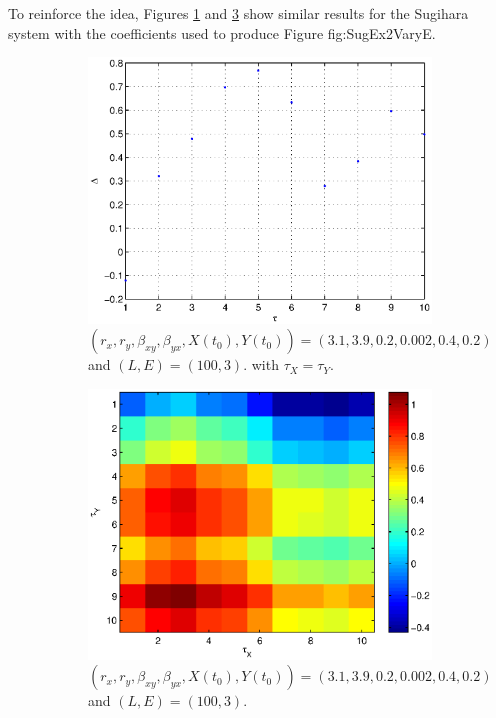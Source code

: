 \documentclass[a4paper,11pt]{article}
\begin{document}
To reinforce the idea, Figures \ref{fig:SugEx2vTauXY} and \ref{fig:SugEx2vTauXvTauY} show similar results for the Sugihara system with the coefficients used to produce Figure {fig:SugEx2VaryE}.
\begin{figure}[h!t]
\centering
\begin{subfigure}[b]{0.4\textwidth}
\label{fig:SugEx2vTauXY}
\includegraphics[scale=0.55]{SugEx2vTauXY.eps}
\caption{ $\left(r_x,r_y,\beta_{xy},\beta_{yx},X(t_0),Y(t_0)\right) = \left(3.1,3.9,0.2,0.002,0.4,0.2\right)$ and $\left(L,E\right) = \left(100,3\right)$. with $\tau_X=\tau_Y$.}
\end{subfigure}
\begin{subfigure}[b]{0.4\textwidth}
\label{fig:SugEx2vTauXvTauY}
\includegraphics[scale=0.55]{SugEx2vTauXvTauY.eps}
\caption{ $\left(r_x,r_y,\beta_{xy},\beta_{yx},X(t_0),Y(t_0)\right) = \left(3.1,3.9,0.2,0.002,0.4,0.2\right)$ and $\left(L,E\right) = \left(100,3\right)$.}
\end{subfigure}
\caption{}
\end{figure}
\end{document}
